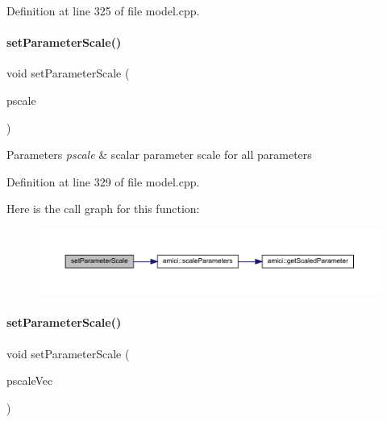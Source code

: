 Definition at line 325 of file model.\+cpp.

\mbox{\label{classamici_1_1_model_a7e25febbfd9db80f64a4f73a2718bda7}} 
\paragraph{\texorpdfstring{setParameterScale()}{setParameterScale()}\hspace{0.1cm}{\footnotesize\ttfamily [1/2]}}
{\footnotesize\ttfamily void set\+Parameter\+Scale (\begin{DoxyParamCaption}\item[{\mbox{\hyperlink{namespaceamici_a42f062082226e9284c201d9eab71a3a0}{Parameter\+Scaling}}}]{pscale }\end{DoxyParamCaption})}


\begin{DoxyParams}{Parameters}
{\em pscale} & scalar parameter scale for all parameters \\
\hline
\end{DoxyParams}


Definition at line 329 of file model.\+cpp.

Here is the call graph for this function\+:
\nopagebreak
\begin{figure}[H]
\begin{center}
\leavevmode
\includegraphics[width=350pt]{classamici_1_1_model_a7e25febbfd9db80f64a4f73a2718bda7_cgraph}
\end{center}
\end{figure}
\mbox{\label{classamici_1_1_model_a5bff74aa6d87148a2cf0943ca1dbd49d}} 
\paragraph{\texorpdfstring{setParameterScale()}{setParameterScale()}\hspace{0.1cm}{\footnotesize\ttfamily [2/2]}}
{\footnotesize\ttfamily void set\+Parameter\+Scale (\begin{DoxyParamCaption}\item[{const std\+::vector$<$ \mbox{\hyperlink{namespaceamici_a42f062082226e9284c201d9eab71a3a0}{Parameter\+Scaling}} $>$ \&}]{pscale\+Vec }\end{DoxyParamCaption})}


